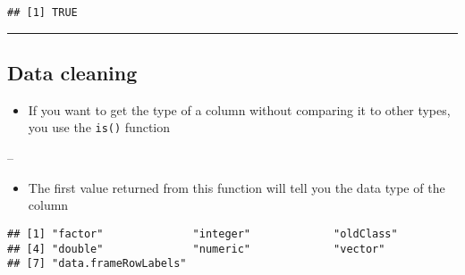\documentclass[]{article}
\newenvironment{Shaded}{\begin{snugshade}}{\end{snugshade}}
\newcommand{\KeywordTok}[1]{\textcolor[rgb]{0.13,0.29,0.53}{\textbf{#1}}}
\newcommand{\NormalTok}[1]{#1}
\newcommand{\OperatorTok}[1]{\textcolor[rgb]{0.81,0.36,0.00}{\textbf{#1}}}
\providecommand{\tightlist}{%
  \setlength{\itemsep}{0pt}\setlength{\parskip}{0pt}}
\begin{document}
\begin{Shaded}
\end{Shaded}

\begin{verbatim}
## [1] TRUE
\end{verbatim}

\begin{center}\rule{0.5\linewidth}{\linethickness}\end{center}

\hypertarget{data-cleaning-2}{%
\subsection{Data cleaning}\label{data-cleaning-2}}

\begin{itemize}
\tightlist
\item
  If you want to get the type of a column without comparing it to other
  types, you use the \texttt{is()} function
\end{itemize}

--

\begin{itemize}
\tightlist
\item
  The first value returned from this function will tell you the data
  type of the column
\end{itemize}

\begin{Shaded}
\end{Shaded}

\begin{verbatim}
## [1] "factor"              "integer"             "oldClass"           
## [4] "double"              "numeric"             "vector"             
## [7] "data.frameRowLabels"
\end{verbatim}

\begin{Shaded}
\end{Shaded}
\end{document}
